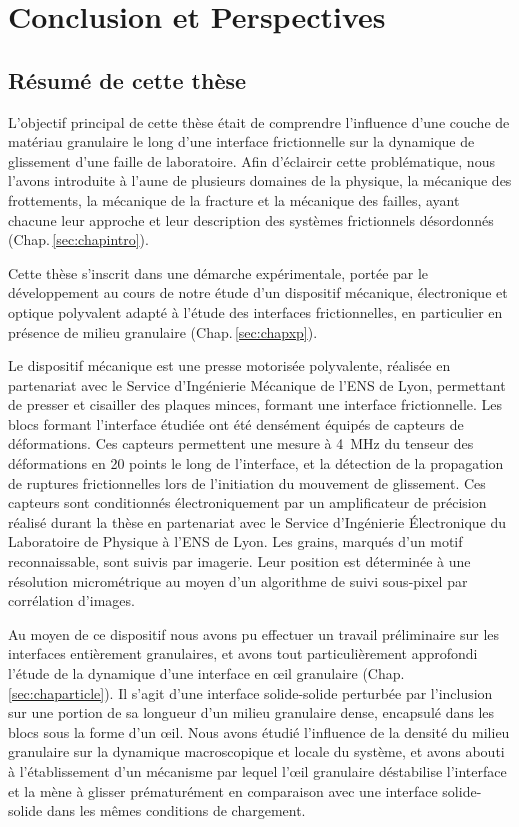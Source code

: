 \chapter{Conclusion et Perspectives}

\minitoc

\section{Résumé de cette thèse}

L'objectif principal de cette thèse était de comprendre l'influence d'une couche de matériau granulaire le long d'une interface frictionnelle sur la dynamique de glissement d'une faille de laboratoire. Afin d'éclaircir cette problématique, nous l'avons introduite à l'aune de plusieurs domaines de la physique, la mécanique des frottements, la mécanique de la fracture et la mécanique des failles, ayant chacune leur approche et leur description des systèmes frictionnels désordonnés (Chap.\,\ref{sec:chapintro}).

Cette thèse s'inscrit dans une démarche expérimentale, portée par le développement au cours de notre étude d'un dispositif mécanique, électronique et optique polyvalent adapté à l'étude des interfaces frictionnelles, en particulier en présence de milieu granulaire (Chap.\,\ref{sec:chapxp}).
\begin{itemize}
\bitem Le dispositif mécanique est une presse motorisée polyvalente, réalisée en partenariat avec le Service d'Ingénierie Mécanique de l'ENS de Lyon, permettant de presser et cisailler des plaques minces, formant une interface frictionnelle.
\bitem Les blocs formant l'interface étudiée ont été densément équipés de capteurs de déformations. Ces capteurs permettent une mesure à \SI{4}{\mega\hertz} du tenseur des déformations en 20 points le long de l'interface, et la détection de la propagation de ruptures frictionnelles lors de l'initiation du mouvement de glissement. Ces capteurs sont conditionnés électroniquement par un amplificateur de précision réalisé durant la thèse en partenariat avec le Service d'Ingénierie Électronique du Laboratoire de Physique à l'ENS de Lyon.
\bitem Les grains, marqués d'un motif reconnaissable, sont suivis par imagerie. Leur position est déterminée à une résolution micrométrique au moyen d'un algorithme de suivi sous-pixel par corrélation d'images.
\end{itemize}

Au moyen de ce dispositif nous avons pu effectuer un travail préliminaire sur les interfaces entièrement granulaires, et avons tout particulièrement approfondi l'étude de la dynamique d'une interface en œil granulaire (Chap.\,\ref{sec:chaparticle}). Il s'agit d'une interface solide-solide perturbée par l'inclusion sur une portion de sa longueur d'un milieu granulaire dense, encapsulé dans les blocs sous la forme d'un œil. Nous avons étudié l'influence de la densité du milieu granulaire sur la dynamique macroscopique et locale du système, et avons abouti à l'établissement d'un mécanisme par lequel l'œil granulaire déstabilise l'interface et la mène à glisser prématurément en comparaison avec une interface solide-solide dans les mêmes conditions de chargement.

